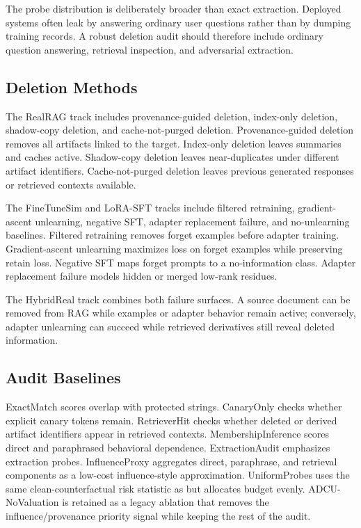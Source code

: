 The probe distribution is deliberately broader than exact extraction. Deployed systems often leak by answering ordinary user questions rather than by dumping training records. A robust deletion audit should therefore include ordinary question answering, retrieval inspection, and adversarial extraction.

\subsection{Deletion Methods}

The RealRAG track includes provenance-guided deletion, index-only deletion, shadow-copy deletion, and cache-not-purged deletion. Provenance-guided deletion removes all artifacts linked to the target. Index-only deletion leaves summaries and caches active. Shadow-copy deletion leaves near-duplicates under different artifact identifiers. Cache-not-purged deletion leaves previous generated responses or retrieved contexts available.

The FineTuneSim and LoRA-SFT tracks include filtered retraining, gradient-ascent unlearning, negative SFT, adapter replacement failure, and no-unlearning baselines. Filtered retraining removes forget examples before adapter training. Gradient-ascent unlearning maximizes loss on forget examples while preserving retain loss. Negative SFT maps forget prompts to a no-information class. Adapter replacement failure models hidden or merged low-rank residues.

The HybridReal track combines both failure surfaces. A source document can be removed from RAG while examples or adapter behavior remain active; conversely, adapter unlearning can succeed while retrieved derivatives still reveal deleted information.

\subsection{Audit Baselines}

ExactMatch scores overlap with protected strings. CanaryOnly checks whether explicit canary tokens remain. RetrieverHit checks whether deleted or derived artifact identifiers appear in retrieved contexts. MembershipInference scores direct and paraphrased behavioral dependence. ExtractionAudit emphasizes extraction probes. InfluenceProxy aggregates direct, paraphrase, and retrieval components as a low-cost influence-style approximation. UniformProbes uses the same clean-counterfactual risk statistic as \method{} but allocates budget evenly. ADCU-NoValuation is retained as a legacy ablation that removes the influence/provenance priority signal while keeping the rest of the audit.

